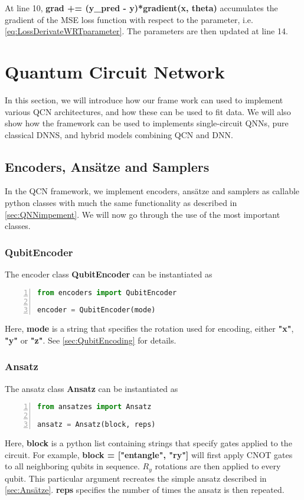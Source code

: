 At line 10, \textbf{grad += (y\_pred - y)*gradient(x, theta)} accumulates the gradient of the MSE loss function with respect to the parameter, i.e. \autoref{eq:LossDerivateWRTparameter}. The parameters are then updated at line 14.


\section{Quantum Circuit Network}\label{sec:QCNimplementation}
In this section, we will introduce how our frame work can used to implement various QCN architectures, and how these can be used to fit data. We will also show how the framework can be used to implements single-circuit QNNs, pure classical DNNS, and hybrid models combining QCN and DNN. 

\subsection{Encoders, Ansätze and Samplers}\label{sec:EAaS}
In the QCN framework, we implement encoders, ansätze and samplers as callable python classes with much the same functionality as described in \autoref{sec:QNNimpement}. We will now go through the use of the most important classes.

\subsubsection*{QubitEncoder}
The encoder class \textbf{QubitEncoder} can be instantiated as 

\begin{lstlisting}[language=python, numbers=left]
from encoders import QubitEncoder

encoder = QubitEncoder(mode)
\end{lstlisting}

Here, \textbf{mode} is a string that specifies the rotation used for encoding, either \textbf{"x"}, \textbf{"y"} or \textbf{"z"}. See \autoref{sec:QubitEncoding} for details.

\subsubsection*{Ansatz}
The ansatz class \textbf{Ansatz} can be instantiated as
\begin{lstlisting}[language=python, numbers=left]
from ansatzes import Ansatz

ansatz = Ansatz(block, reps)
\end{lstlisting}
Here, \textbf{block} is a python list containing strings that specify gates applied to the circuit. For example, 
\textbf{block = ["entangle", "ry"]} will first apply CNOT gates to all neighboring qubits in sequence. $R_y$ rotations are then applied to every qubit. This particular argument recreates the simple ansatz described in \autoref{sec:Ansätze}. \textbf{reps} specifies the number of times the ansatz is then repeated.

